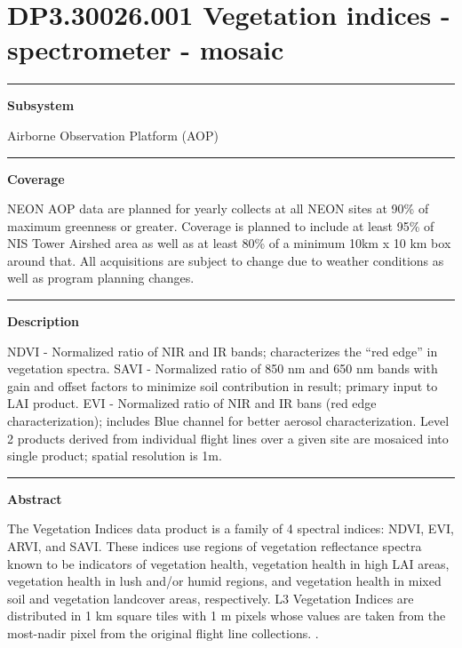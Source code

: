 \documentclass[]{article}
\begin{document}
\section{DP3.30026.001 Vegetation indices - spectrometer -
mosaic}\label{dp3.30026.001-vegetation-indices---spectrometer---mosaic}

\begin{center}\rule{0.5\linewidth}{\linethickness}\end{center}

\textbf{Subsystem}

Airborne Observation Platform (AOP)

\begin{center}\rule{0.5\linewidth}{\linethickness}\end{center}

\textbf{Coverage}

NEON AOP data are planned for yearly collects at all NEON sites at 90\%
of maximum greenness or greater. Coverage is planned to include at least
95\% of NIS Tower Airshed area as well as at least 80\% of a minimum
10km x 10 km box around that. All acquisitions are subject to change due
to weather conditions as well as program planning changes.

\begin{center}\rule{0.5\linewidth}{\linethickness}\end{center}

\textbf{Description}

NDVI - Normalized ratio of NIR and IR bands; characterizes the ``red
edge'' in vegetation spectra. SAVI - Normalized ratio of 850 nm and 650
nm bands with gain and offset factors to minimize soil contribution in
result; primary input to LAI product. EVI - Normalized ratio of NIR and
IR bans (red edge characterization); includes Blue channel for better
aerosol characterization. Level 2 products derived from individual
flight lines over a given site are mosaiced into single product; spatial
resolution is 1m.

\begin{center}\rule{0.5\linewidth}{\linethickness}\end{center}

\textbf{Abstract}

The Vegetation Indices data product is a family of 4 spectral indices:
NDVI, EVI, ARVI, and SAVI. These indices use regions of vegetation
reflectance spectra known to be indicators of vegetation health,
vegetation health in high LAI areas, vegetation health in lush and/or
humid regions, and vegetation health in mixed soil and vegetation
landcover areas, respectively. L3 Vegetation Indices are distributed in
1 km square tiles with 1 m pixels whose values are taken from the
most-nadir pixel from the original flight line collections. \newpage
.
\end{document}
